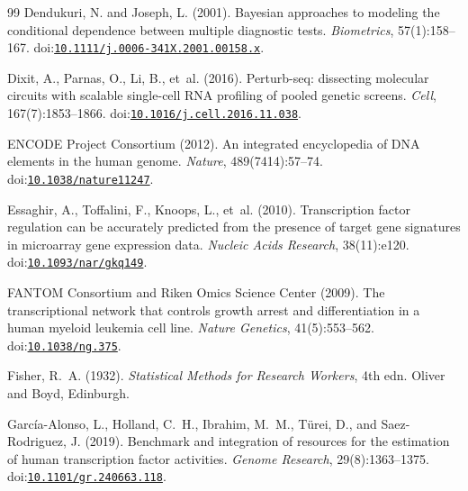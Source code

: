 \begin{thebibliography}{99}
Dendukuri, N. and Joseph, L. (2001).
\newblock Bayesian approaches to modeling the conditional dependence between multiple diagnostic tests.
\newblock \emph{Biometrics}, 57(1):158--167.
\newblock doi:\href{https://doi.org/10.1111/j.0006-341X.2001.00158.x}{\nolinkurl{10.1111/j.0006-341X.2001.00158.x}}.

Dixit, A., Parnas, O., Li, B., et~al. (2016).
\newblock Perturb-seq: dissecting molecular circuits with scalable single-cell {RNA} profiling of pooled genetic screens.
\newblock \emph{Cell}, 167(7):1853--1866.
\newblock doi:\href{https://doi.org/10.1016/j.cell.2016.11.038}{\nolinkurl{10.1016/j.cell.2016.11.038}}.

{ENCODE Project Consortium} (2012).
\newblock An integrated encyclopedia of {DNA} elements in the human genome.
\newblock \emph{Nature}, 489(7414):57--74.
\newblock doi:\href{https://doi.org/10.1038/nature11247}{\nolinkurl{10.1038/nature11247}}.

Essaghir, A., Toffalini, F., Knoops, L., et~al. (2010).
\newblock Transcription factor regulation can be accurately predicted from the presence of target gene signatures in microarray gene expression data.
\newblock \emph{Nucleic Acids Research}, 38(11):e120.
\newblock doi:\href{https://doi.org/10.1093/nar/gkq149}{\nolinkurl{10.1093/nar/gkq149}}.

{FANTOM Consortium and Riken Omics Science Center} (2009).
\newblock The transcriptional network that controls growth arrest and differentiation in a human myeloid leukemia cell line.
\newblock \emph{Nature Genetics}, 41(5):553--562.
\newblock doi:\href{https://doi.org/10.1038/ng.375}{\nolinkurl{10.1038/ng.375}}.

Fisher, R.~A. (1932).
\newblock \emph{Statistical Methods for Research Workers}, 4th edn.
\newblock Oliver and Boyd, Edinburgh.

Garc{\'i}a-Alonso, L., Holland, C.~H., Ibrahim, M.~M., T{\"u}rei, D., and Saez-Rodriguez, J. (2019).
\newblock Benchmark and integration of resources for the estimation of human transcription factor activities.
\newblock \emph{Genome Research}, 29(8):1363--1375.
\newblock doi:\href{https://doi.org/10.1101/gr.240663.118}{\nolinkurl{10.1101/gr.240663.118}}.


\end{thebibliography}
